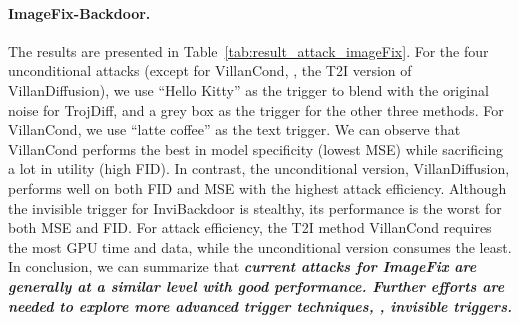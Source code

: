\paragraph{ImageFix-Backdoor.}
The results are presented in Table~\ref{tab:result_attack_imageFix}. 
For the four unconditional attacks (except for VillanCond, \ie, the T2I version of VillanDiffusion), we use ``Hello Kitty'' as the trigger to blend with the original noise for TrojDiff, and a grey box as the trigger for the other three methods. For VillanCond, we use ``latte coffee'' as the text trigger.
We can observe that VillanCond performs the best in model specificity (lowest MSE) while sacrificing a lot in utility (high FID). In contrast, the unconditional version, VillanDiffusion, performs well on both FID and MSE with the highest attack efficiency. Although the invisible trigger for InviBackdoor is stealthy, its performance is the worst for both MSE and FID. For attack efficiency, the T2I method VillanCond requires the most GPU time and data, while the unconditional version consumes the least.
In conclusion, we can summarize that \textbf{\textit{current attacks for ImageFix are generally at a similar level with good performance. Further efforts are needed to explore more advanced trigger techniques, \eg, invisible triggers.}}

